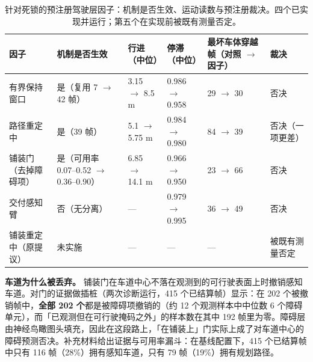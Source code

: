 \documentclass[journal]{IEEEtran}
\begin{document}
\begin{table}[!t]
\centering
\caption{针对死锁的预注册驾驶层因子：机制是否生效、运动读数与预注册裁决。四个已实现并运行；第五个在实现前被既有测量否定。}
\begin{tabular}{@{}llllll@{}}
\toprule
因子 & 机制是否生效 & 行进（中位） & 停滞（中位） & 最坏车体穿越帧（对照 $\rightarrow$ 因子） & 裁决 \\
\midrule
有界保持窗口 & 是（复用 7 $\rightarrow$ 42 帧） & 3.15 $\rightarrow$ 8.5 m & 0.986 $\rightarrow$ 0.958 & 29 $\rightarrow$ 30 & 否决 \\
路径重定中 & 是（39 帧） & 5.1 $\rightarrow$ 5.75 m & 0.984 $\rightarrow$ 0.980 & 84 $\rightarrow$ 39 & 否决（一项更差） \\
铺装门（去掉障碍项） & 是（可用率 0.07--0.52 $\rightarrow$ 0.36--0.90） & 6.85 $\rightarrow$ 14.1 m & 0.966 $\rightarrow$ 0.950 & 23 $\rightarrow$ 66 & 否决 \\
交付感知臂 & 否（无分离） & --- & 0.979 $\rightarrow$ 0.995 & 36 $\rightarrow$ 49 & 否决 \\
铺装重定中（原提议） & 未实施 & --- & --- & --- & 被既有测量否定 \\
\bottomrule
\end{tabular}
\end{table}
\textbf{车道为什么被丢弃。} 铺装门在车道中心不落在观测到的可行驶表面上时撤销感知车道。对门的证据做插桩（两次诊断运行，415 个已结算帧）显示：在 202 个被撤销帧中，\textbf{全部 202 个}都是被障碍项撤销的（约 12 个观测样本中中位数 6 个障碍单元），而「已观测但在可行驶掩码之外」的样本数在其中 192 帧里为零。障碍层由神经鸟瞰图头填充，因此在这段路上，「在铺装上」门实际上成了对车道中心的障碍预测否决。补充材料给出证据与可用率漏斗：在基线配置下，415 个已结算帧中只有 116 帧（28\%）拥有感知车道，只有 79 帧（19\%）拥有规划路径。
\end{document}
